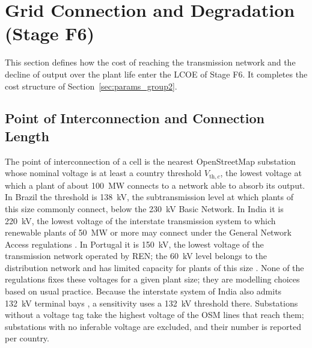 \section{Grid Connection and Degradation (Stage F6)}
\label{sec:params_group3}

This section defines how the cost of reaching the transmission network
and the decline of output over the plant life enter the LCOE of Stage F6.
It completes the cost structure of Section~\ref{sec:params_group2}.

\subsection{Point of Interconnection and Connection Length}
\label{subsec:g3_poi}

The point of interconnection of a cell is the nearest OpenStreetMap
substation whose nominal voltage is at least a country threshold
$V_{\mathrm{th},c}$, the lowest voltage at which a plant of about 100~MW
connects to a network able to absorb its output. In Brazil the threshold
is 138~kV, the subtransmission level at which plants of this size
commonly connect, below the 230~kV Basic Network. In India it is 220~kV,
the lowest voltage of the interstate transmission system to which
renewable plants of 50~MW or more may connect under the General Network
Access regulations \cite{cerc2022gna}. In Portugal it is 150~kV, the
lowest voltage of the transmission network operated by REN; the 60~kV
level belongs to the distribution network and has limited capacity for
plants of this size \cite{renDadosTecnicos2024}. None of the regulations
fixes these voltages for a given plant size; they are modelling choices
based on usual practice. Because the interstate system of India also
admits 132~kV terminal bays \cite{cerc2022gna}, a sensitivity uses a
132~kV threshold there. Substations without a voltage tag take the highest voltage of the OSM
lines that reach them; substations with no inferable voltage are
excluded, and their number is reported per country.

